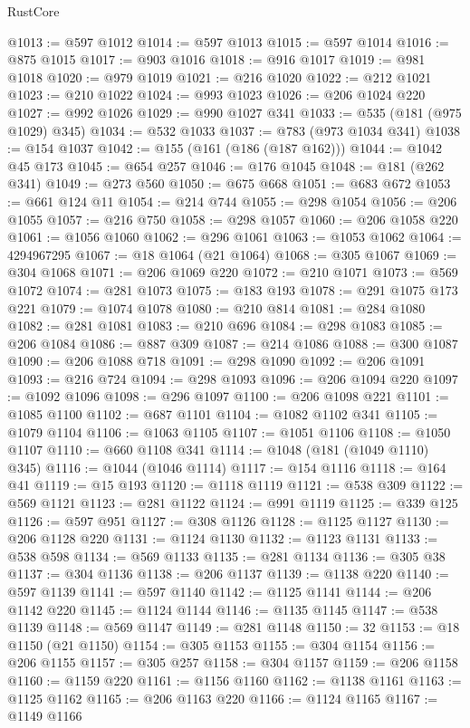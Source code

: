 \begin{lexlean}{RustCore}
\begin{coremodule}
@1013 := @597 @1012
@1014 := @597 @1013
@1015 := @597 @1014
@1016 := @875 @1015
@1017 := @903 @1016
@1018 := @916 @1017
@1019 := @981 @1018
@1020 := @979 @1019
@1021 := @216 @1020
@1022 := @212 @1021
@1023 := @210 @1022
@1024 := @993 @1023
@1026 := @206 @1024 @220
@1027 := @992 @1026
@1029 := @990 @1027 @341
@1033 := @535 (@181 (@975 @1029) @345)
@1034 := @532 @1033
@1037 := @783 (@973 @1034 @341)
@1038 := @154 @1037
@1042 := @155 (@161 (@186 (@187 @162)))
@1044 := @1042 @45 @173
@1045 := @654 @257
@1046 := @176 @1045
@1048 := @181 (@262 @341)
@1049 := @273 @560
@1050 := @675 @668
@1051 := @683 @672
@1053 := @661 @124 @11
@1054 := @214 @744
@1055 := @298 @1054
@1056 := @206 @1055
@1057 := @216 @750
@1058 := @298 @1057
@1060 := @206 @1058 @220
@1061 := @1056 @1060
@1062 := @296 @1061
@1063 := @1053 @1062
@1064 := 4294967295
@1067 := @18 @1064 (@21 @1064)
@1068 := @305 @1067
@1069 := @304 @1068
@1071 := @206 @1069 @220
@1072 := @210 @1071
@1073 := @569 @1072
@1074 := @281 @1073
@1075 := @183 @193
@1078 := @291 @1075 @173 @221
@1079 := @1074 @1078
@1080 := @210 @814
@1081 := @284 @1080
@1082 := @281 @1081
@1083 := @210 @696
@1084 := @298 @1083
@1085 := @206 @1084
@1086 := @887 @309
@1087 := @214 @1086
@1088 := @300 @1087
@1090 := @206 @1088 @718
@1091 := @298 @1090
@1092 := @206 @1091
@1093 := @216 @724
@1094 := @298 @1093
@1096 := @206 @1094 @220
@1097 := @1092 @1096
@1098 := @296 @1097
@1100 := @206 @1098 @221
@1101 := @1085 @1100
@1102 := @687 @1101
@1104 := @1082 @1102 @341
@1105 := @1079 @1104
@1106 := @1063 @1105
@1107 := @1051 @1106
@1108 := @1050 @1107
@1110 := @660 @1108 @341
@1114 := @1048 (@181 (@1049 @1110) @345)
@1116 := @1044 (@1046 @1114)
@1117 := @154 @1116
@1118 := @164 @41
@1119 := @15 @193
@1120 := @1118 @1119
@1121 := @538 @309
@1122 := @569 @1121
@1123 := @281 @1122
@1124 := @991 @1119
@1125 := @339 @125
@1126 := @597 @951
@1127 := @308 @1126
@1128 := @1125 @1127
@1130 := @206 @1128 @220
@1131 := @1124 @1130
@1132 := @1123 @1131
@1133 := @538 @598
@1134 := @569 @1133
@1135 := @281 @1134
@1136 := @305 @38
@1137 := @304 @1136
@1138 := @206 @1137
@1139 := @1138 @220
@1140 := @597 @1139
@1141 := @597 @1140
@1142 := @1125 @1141
@1144 := @206 @1142 @220
@1145 := @1124 @1144
@1146 := @1135 @1145
@1147 := @538 @1139
@1148 := @569 @1147
@1149 := @281 @1148
@1150 := 32
@1153 := @18 @1150 (@21 @1150)
@1154 := @305 @1153
@1155 := @304 @1154
@1156 := @206 @1155
@1157 := @305 @257
@1158 := @304 @1157
@1159 := @206 @1158
@1160 := @1159 @220
@1161 := @1156 @1160
@1162 := @1138 @1161
@1163 := @1125 @1162
@1165 := @206 @1163 @220
@1166 := @1124 @1165
@1167 := @1149 @1166

\end{coremodule}
\end{lexlean}
